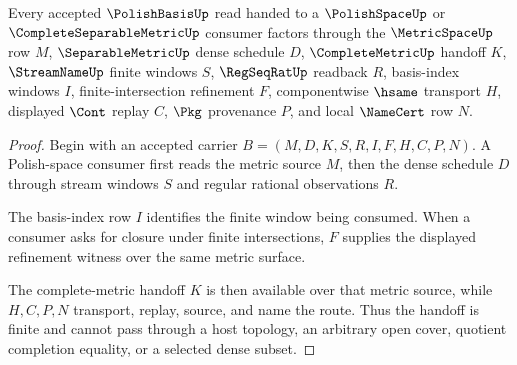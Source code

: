 \begin{theorem}
\label{thm:polish-basis-complete-separable-handoff}
Every accepted $\PolishBasisUp$ read handed to a $\PolishSpaceUp$ or $\CompleteSeparableMetricUp$ consumer factors through the $\MetricSpaceUp$ row $M$, $\SeparableMetricUp$ dense schedule $D$, $\CompleteMetricUp$ handoff $K$, $\StreamNameUp$ finite windows $S$, $\RegSeqRatUp$ readback $R$, basis-index windows $I$, finite-intersection refinement $F$, componentwise $\hsame$ transport $H$, displayed $\Cont$ replay $C$, $\Pkg$ provenance $P$, and local $\NameCert$ row $N$.
\end{theorem}
\begin{proof}
Begin with an accepted carrier $B=(M,D,K,S,R,I,F,H,C,P,N)$. A Polish-space consumer first reads the metric source $M$, then the dense schedule $D$ through stream windows $S$ and regular rational observations $R$.

The basis-index row $I$ identifies the finite window being consumed. When a consumer asks for closure under finite intersections, $F$ supplies the displayed refinement witness over the same metric surface.

The complete-metric handoff $K$ is then available over that metric source, while $H,C,P,N$ transport, replay, source, and name the route. Thus the handoff is finite and cannot pass through a host topology, an arbitrary open cover, quotient completion equality, or a selected dense subset.
\end{proof}


\begin{closurestatus}{\PolishBasisUp}
  \theoryclosure{\seedClosure}
  \formalstatus{\unformalizedV}
\end{closurestatus}
